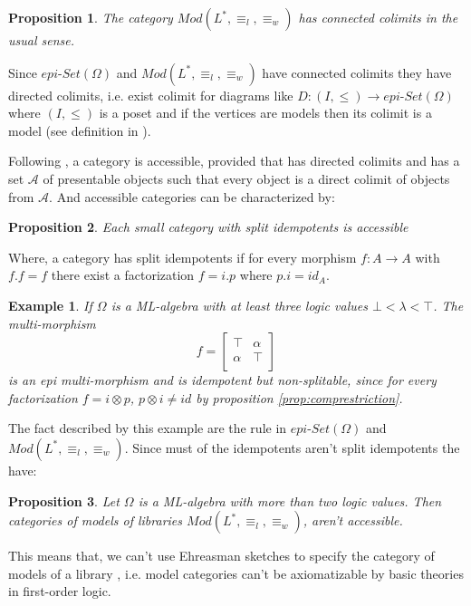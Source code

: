 \documentclass[oribibl]{llncs}
\newtheorem{prop}{Proposition}
\newtheorem{exam}{Example}
\newcommand{\A}{\mathcal{A}}
\begin{document}
\begin{prop}
The category $Mod(L^\ast,\equiv_l,\equiv_w)$ has connected colimits in the usual sense.  \end{prop}

Since $epi$-$Set(\Omega)$ and $Mod(L^\ast,\equiv_l,\equiv_w)$ have connected colimits they have directed colimits, i.e. exist colimit for diagrams like $D:(I,\leq)\rightarrow epi$-$Set(\Omega)$  where $(I,\leq)$ is a poset and if the vertices are models then its colimit is a model (see definition in \cite{Adamek94}).

Following \cite{Adamek94}, a category is accessible, provided that has directed colimits and has a set $\A$ of presentable objects such that every object is a direct colimit of objects from $\A$. And accessible categories can be characterized by:

\begin{prop}\cite{Adamek94}
Each small category with split idempotents is accessible
\end{prop}
Where, a category has split idempotents if for every morphism $f:A\rightarrow A$ with $f.f=f$ there exist a factorization $f=i.p$ where $p.i=id_A$.

\begin{exam}
If $\Omega$ is a ML-algebra with at least three logic values $\bot<\lambda<\top$. The multi-morphism \[f=\left[
     \begin{array}{cc}
       \top   & \alpha \\
       \alpha & \top \\
     \end{array}
   \right]
\]
is an epi multi-morphism and is idempotent but non-splitable, since for every factorization $f=i\otimes p$, $p\otimes i\neq id$ by proposition \ref{prop:comprestriction}.
\end{exam}

The fact described by this example are the rule in $epi$-$Set(\Omega)$ and $Mod(L^\ast,\equiv_l,\equiv_w)$. Since must of the idempotents aren't split idempotents the have:

\begin{prop}
Let $\Omega$ is a ML-algebra with more than two logic values. Then categories of models of libraries $Mod(L^\ast,\equiv_l,\equiv_w)$, aren't accessible.
\end{prop}

This means that, we can't use Ehreasman sketches to specify the category of models of a library \cite{Adamek94}, i.e. model categories can't be axiomatizable by basic theories in first-order logic.
\end{document}
